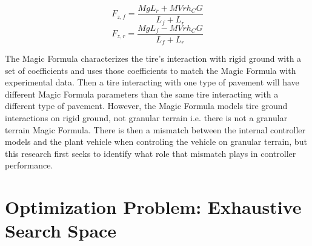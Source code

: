 \documentclass[12pt,onecolumn]{report}
\begin{document}
\begin{equation}\label{e:FrontLoad}
F_{z,f}= \frac{MgL_r + MVrh_CG}{L_f+L_r} 
\end{equation}
\begin{equation}\label{e:RearLoad}
F_{z,r}= \frac{MgL_f - MVrh_CG}{L_f+L_r} 
\end{equation}

The Magic Formula characterizes the tire's interaction with rigid ground with a set of coefficients and uses those coefficients to match the Magic Formula with experimental data. Then a tire interacting with one type of pavement will have different Magic Formula parameters than the same tire interacting with a different type of pavement. However, the Magic Formula models tire ground interactions on rigid ground, not granular terrain i.e. there is not a granular terrain Magic Formula. There is then a mismatch between the internal controller models and the plant vehicle when controling the vehicle on granular terrain, but this research first seeks to identify what role that mismatch plays in controller performance. 


\section{Optimization Problem: Exhaustive Search Space}\label{s:Optimization}

\end{document}
